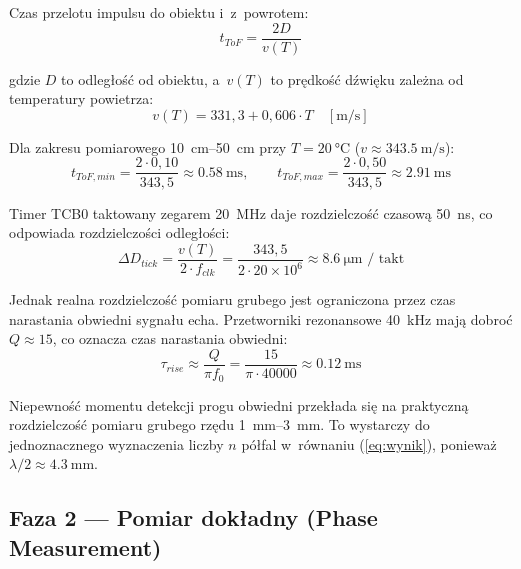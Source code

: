\documentclass[a4paper,11pt]{article}
\begin{document}
Czas przelotu impulsu do obiektu i~z~powrotem:
\begin{equation}
    t_{ToF} = \frac{2D}{v(T)}
    \label{eq:tof}
\end{equation}

gdzie $D$ to odległość od obiektu, a~$v(T)$ to prędkość dźwięku zależna
od temperatury powietrza:
\begin{equation}
    v(T) = 331{,}3 + 0{,}606 \cdot T \quad [\si{\metre\per\second}]
    \label{eq:predkosc_dzwieku}
\end{equation}

Dla zakresu pomiarowego \SIrange{10}{50}{\centi\metre} przy $T = \SI{20}{\celsius}$
($v \approx \SI{343,5}{\metre\per\second}$):
\begin{equation}
    t_{ToF,min} = \frac{2 \cdot 0{,}10}{343{,}5} \approx \SI{0,58}{\milli\second}, \qquad
    t_{ToF,max} = \frac{2 \cdot 0{,}50}{343{,}5} \approx \SI{2,91}{\milli\second}
    \label{eq:tof_zakres}
\end{equation}

Timer TCB0 taktowany zegarem \SI{20}{\mega\hertz} daje rozdzielczość
czasową \SI{50}{\nano\second}, co odpowiada rozdzielczości odległości:
\begin{equation}
    \Delta D_{tick} = \frac{v(T)}{2 \cdot f_{clk}} = \frac{343{,}5}{2 \cdot 20 \times 10^6} \approx \SI{8,6}{\micro\metre} \text{ / takt}
    \label{eq:rozdzielczosc_tick}
\end{equation}

Jednak realna rozdzielczość pomiaru grubego jest ograniczona przez czas narastania
obwiedni sygnału echa. Przetworniki rezonansowe \SI{40}{\kilo\hertz} mają
dobroć $Q \approx 15$, co oznacza czas narastania obwiedni:
\begin{equation}
    \tau_{rise} \approx \frac{Q}{\pi f_0} = \frac{15}{\pi \cdot 40000} \approx \SI{0,12}{\milli\second}
    \label{eq:tau_rise}
\end{equation}

Niepewność momentu detekcji progu obwiedni przekłada się na praktyczną
rozdzielczość pomiaru grubego rzędu \SIrange{1}{3}{\milli\metre}. To wystarczy
do jednoznacznego wyznaczenia liczby $n$ półfal w~równaniu (\ref{eq:wynik}),
ponieważ $\lambda/2 \approx \SI{4,3}{\milli\metre}$.

\subsection{Faza 2 --- Pomiar dokładny (Phase Measurement)}
\label{sec:phase}
\end{document}
